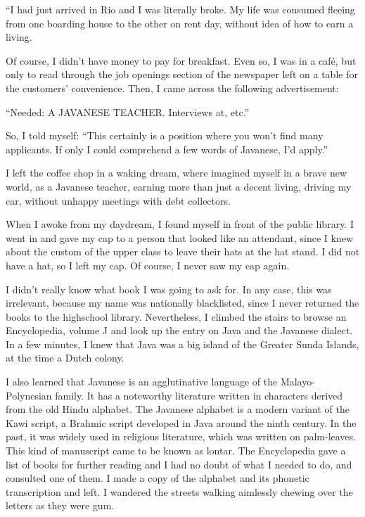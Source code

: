 \documentclass[a4paper,12pt]{book}
\begin{document}
``I had just arrived in Rio and I was literally broke.
My life was consumed fleeing
from one boarding house to
the other on rent day, without
idea of how to earn a living.

Of course, I didn't have money
to pay for breakfast.
Even so, I was in a café, but only to
read through the job openings section
of the newspaper left on a table
for the customers' convenience. Then, I came across
the following advertisement:


``Needed: A JAVANESE TEACHER.  Interviews at, etc.''

So, I told myself: ``This certainly is a position
where you won't find many applicants. If only I
could comprehend a few words of Javanese,
I'd apply.''

I left the coffee shop in a waking dream,
where imagined myself in a brave new world,
as a Javanese teacher,
earning more than just a decent living,
driving my car,
without unhappy meetings with debt collectors.

When I awoke from my daydream,
I found myself in front of the public library.
I went in and gave my cap to a
person that looked like an attendant,
since I knew about the custom of the
upper class to leave their hats at
the hat stand. I did not have
a hat, so I left my cap. Of course,
I never saw my cap again.

I didn't really know what
book I was going to ask for.
In any case, this was irrelevant,
because my name was nationally blacklisted,
since I never returned the books to
the highschool library. Nevertheless,
I climbed the stairs to browse
an Encyclopedia,
volume J and look up the entry on
Java and the Javanese dialect. 
In a few minutes, I knew that Java was a
big island of the Greater Sunda Islands,
at the time a Dutch colony.

I also learned that Javanese is an agglutinative
language of the Malayo-Polynesian family.
It has a noteworthy literature written in
characters derived from the old Hindu alphabet.
The Javanese alphabet is a modern variant
of the Kawi script, a Brahmic script developed
in Java around the ninth century.
In the past, it was widely used in religious literature,
which was written on palm-leaves.
This kind of manuscript came to be known
as  lontar.
The Encyclopedia gave a list of books for further
reading and I had no doubt of what I needed
to do, and consulted one of them.
I made a copy of the alphabet and its phonetic
transcription and left. I wandered the streets
walking aimlessly chewing over the letters as
they were gum.
\end{document}

